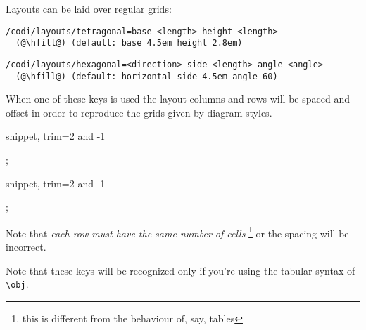 Layouts can be laid over regular grids:

\begin{lstlisting}
/codi/layouts/tetragonal=base <length> height <length>
  (@\hfill@) (default: base 4.5em height 2.8em)
\end{lstlisting}

\begin{lstlisting}
/codi/layouts/hexagonal=<direction> side <length> angle <angle>
  (@\hfill@) (default: horizontal side 4.5em angle 60)
\end{lstlisting}

When one of these keys is used the layout columns and rows will be
spaced and offset in order to reproduce the grids given by diagram styles.

\begin{tcblisting}{snippet, trim={2 and -1}}
\begin{codi}
  ;
\end{codi}
\end{tcblisting}

\begin{tcblisting}{snippet, trim={2 and -1}}
\begin{codi}
  ;
\end{codi}
\end{tcblisting}

Note that \emph{each row must have the same number of cells}%
\footnote{this is different from the behaviour of, say, tables}
or the spacing will be incorrect.

Note that these keys will be recognized only if you're using the tabular syntax of \lstinline|\obj|.
